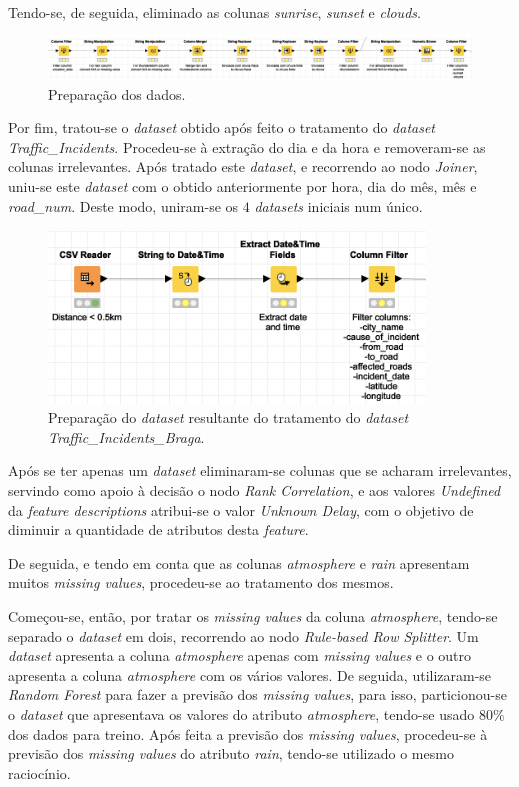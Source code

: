 \documentclass[a4paper, 12pt]{article}
\begin{document}
Tendo-se, de seguida, eliminado as colunas \textit{sunrise}, \textit{sunset} e \textit{clouds}.

\begin{figure}[H]
	\centering
	\includegraphics[width=15cm]{prep}
	\caption{Preparação dos dados.}
\end{figure}

Por fim, tratou-se o \textit{dataset} obtido após feito o tratamento do \textit{dataset Traffic\_Incidents}. Procedeu-se à extração do dia e da hora e removeram-se as colunas irrelevantes. Após tratado este \textit{dataset}, e recorrendo ao nodo \textit{Joiner}, uniu-se este \textit{dataset} com o obtido anteriormente por hora, dia do mês, mês e \textit{road\_num}. Deste modo, uniram-se os $4$ \textit{datasets} iniciais num único.

\begin{figure}[H]
	\centering
	\includegraphics[width=10cm]{Incident}
	\caption{Preparação do \textit{dataset} resultante do tratamento do \textit{dataset Traffic\_Incidents\_Braga}.}
\end{figure}

Após se ter apenas um \textit{dataset} eliminaram-se colunas que se acharam irrelevantes, servindo como apoio à decisão o nodo \textit{Rank Correlation}, e aos valores \textit{Undefined} da \textit{feature descriptions} atribui-se o valor \textit{Unknown Delay}, com o objetivo de diminuir a quantidade de atributos desta \textit{feature}.

De seguida, e tendo em conta que as colunas \textit{atmosphere} e \textit{rain} apresentam muitos \textit{missing values}, procedeu-se ao tratamento dos mesmos. 

Começou-se, então, por tratar os \textit{missing values} da coluna \textit{atmosphere}, tendo-se separado o \textit{dataset} em dois, recorrendo ao nodo \textit{Rule-based Row Splitter}. Um \textit{dataset} apresenta a coluna \textit{atmosphere} apenas com \textit{missing values} e o outro apresenta a coluna \textit{atmosphere} com os vários valores. De seguida, utilizaram-se \textit{Random Forest} para fazer a previsão dos \textit{missing values}, para isso, particionou-se o \textit{dataset} que apresentava os valores do atributo \textit{atmosphere}, tendo-se usado $80\%$ dos dados para treino. Após feita a previsão dos \textit{missing values}, procedeu-se à previsão dos \textit{missing values} do atributo \textit{rain}, tendo-se utilizado o mesmo raciocínio.
\end{document}
